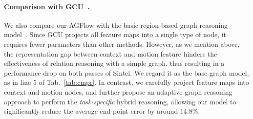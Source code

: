 \documentclass[letterpaper]{article} %
\begin{document}
\paragraph{Comparison with GCU~\cite{Li2018BeyondGL}.}
We also compare our AGFlow with the basic region-based graph reasoning model~\cite{Li2018BeyondGL}. Since GCU projects all feature maps into a single type of node, it requires fewer parameters than other methods. However, as we mention above, the representation gap between context and motion feature hinders the effectiveness of relation reasoning with a simple graph, thus resulting in a performance drop on both passes of Sintel. We regard it as the base graph model, as in line 5 of Tab.~\ref{tab:cmpr}. In contrast, we carefully project feature maps into context and motion nodes, and further propose an adaptive graph reasoning approach to perform the {\em task-specific} hybrid reasoning, allowing our model to significantly reduce the average end-point error by around $14.8\%$.

\begin{table}[t]
\centering
{}
\caption{Quantitative comparisons with related methods (refer to Sec.~\ref{sec:4} for more details). We set RAFT~\cite{Teed2020RAFTRA} as the baseline model for the method with regular gird space enhancement. The methods in each part are plugged into the same baseline and trained on C + T ($180k$) for fair comparison.}
\label{tab:cmpr}
\end{table}
\end{document}
